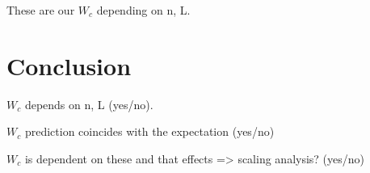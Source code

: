 \documentclass[reprint,amsmath,amssymb,aps,prb]{revtex4-2}
\begin{document}
These are our $W_c$ depending on n, L.



\section{Conclusion}%

$W_c$ depends on n, L (yes/no).

$W_c$ prediction coincides with the expectation (yes/no)

$W_c$ is dependent on these and that effects => scaling analysis? (yes/no)



\newpage
\appendix
\end{document}
